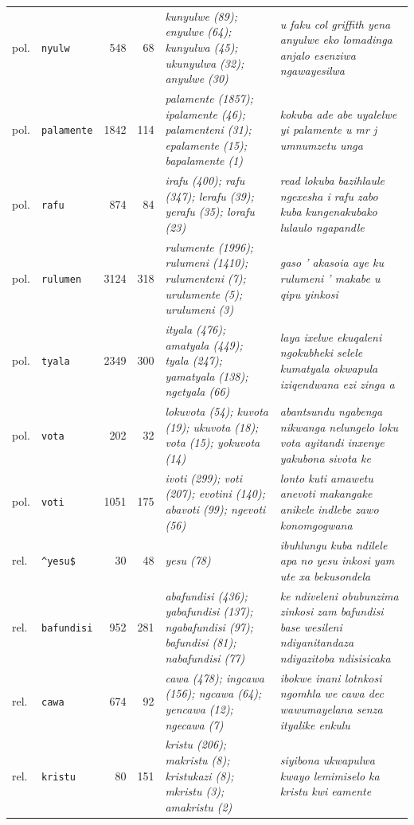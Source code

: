 \begin{table}[h]
\begin{tabular}{@{}llrrp{}p{}@{}}
pol. & \texttt{nyulw} & 548 & 68 & \emph{kunyulwe (89); enyulwe (64); kunyulwa (45); ukunyulwa (32); anyulwe (30)} & \emph{u faku col griffith yena anyulwe eko lomadinga anjalo esenziwa ngawayesilwa} \\
pol. & \texttt{palamente} & 1842 & 114 & \emph{palamente (1857); ipalamente (46); palamenteni (31); epalamente (15); bapalamente (1)} & \emph{kokuba ade abe uyalelwe yi palamente u mr j umnumzetu unga} \\
pol. & \texttt{rafu} & 874 & 84 & \emph{irafu (400); rafu (347); lerafu (39); yerafu (35); lorafu (23)} & \emph{read lokuba bazihlaule ngexesha i rafu zabo kuba kungenakubako lulaulo ngapandle} \\
pol. & \texttt{rulumen} & 3124 & 318 & \emph{rulumente (1996); rulumeni (1410); rulumenteni (7); urulumente (5); urulumeni (3)} & \emph{gaso ' akasoia aye ku rulumeni ' makabe u qipu yinkosi} \\
pol. & \texttt{tyala} & 2349 & 300 & \emph{ityala (476); amatyala (449); tyala (247); yamatyala (138); ngetyala (66)} & \emph{laya ixelwe ekuqaleni ngokubheki selele kumatyala okwapula iziqendwana ezi zinga a} \\
pol. & \texttt{vota} & 202 & 32 & \emph{lokuvota (54); kuvota (19); ukuvota (18); vota (15); yokuvota (14)} & \emph{abantsundu ngabenga nikwanga nelungelo loku vota ayitandi inxenye yakubona sivota ke} \\
pol. & \texttt{voti} & 1051 & 175 & \emph{ivoti (299); voti (207); evotini (140); abavoti (99); ngevoti (56)} & \emph{lonto kuti amawetu anevoti makangake anikele indlebe zawo konomgogwana} \\
rel. & \texttt{\^{}yesu\$} & 30 & 48 & \emph{yesu (78)} & \emph{ibuhlungu kuba ndilele apa no yesu inkosi yam ute xa bekusondela} \\
rel. & \texttt{bafundisi} & 952 & 281 & \emph{abafundisi (436); yabafundisi (137); ngabafundisi (97); bafundisi (81); nabafundisi (77)} & \emph{ke ndiveleni obubunzima zinkosi zam bafundisi base wesileni ndiyanitandaza ndiyazitoba ndisisicaka} \\
rel. & \texttt{cawa} & 674 & 92 & \emph{cawa (478); ingcawa (156); ngcawa (64); yencawa (12); ngecawa (7)} & \emph{ibokwe inani lotnkosi ngomhla we cawa dec wawumayelana senza ityalike enkulu} \\
rel. & \texttt{kristu} & 80 & 151 & \emph{kristu (206); makristu (8); kristukazi (8); mkristu (3); amakristu (2)} & \emph{siyibona ukwapulwa kwayo lemimiselo ka kristu kwi eamente} \\

\end{tabular}
\end{table}
